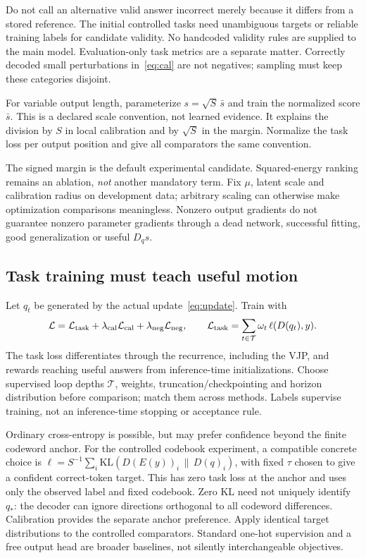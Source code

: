 \documentclass[11pt,a4paper]{article}
\begin{document}
Do not call an alternative valid answer incorrect merely because it differs from a stored reference. The initial controlled tasks need unambiguous targets or reliable training labels for candidate validity. No handcoded validity rules are supplied to the main model. Evaluation-only task metrics are a separate matter. Correctly decoded small perturbations in~\eqref{eq:cal} are not negatives; sampling must keep these categories disjoint.

For variable output length, parameterize $s=\sqrt S\,\bar s$ and train the normalized score $\bar s$. This is a declared scale convention, not learned evidence. It explains the division by $S$ in local calibration and by $\sqrt S$ in the margin. Normalize the task loss per output position and give all comparators the same convention.

The signed margin is the default experimental candidate. Squared-energy ranking remains an ablation, \emph{not} another mandatory term. Fix $\mu$, latent scale and calibration radius on development data; arbitrary scaling can otherwise make optimization comparisons meaningless. Nonzero output gradients do not guarantee nonzero parameter gradients through a dead network, successful fitting, good generalization or useful $D_qs$.

\subsection{Task training must teach useful motion}
Let $q_t$ be generated by the actual update~\eqref{eq:update}. Train with
\begin{equation}
\mathcal L=\mathcal L_{\rm task}
+\lambda_{\rm cal}\mathcal L_{\rm cal}
+\lambda_{\rm neg}\mathcal L_{\rm neg},\qquad
\mathcal L_{\rm task}=\sum_{t\in\mathcal T}\omega_t\,\ell(D(q_t),y).\label{eq:loss}
\end{equation}
The task loss differentiates through the recurrence, including the VJP, and rewards reaching useful answers from inference-time initializations. Choose supervised loop depths $\mathcal T$, weights, truncation/checkpointing and horizon distribution before comparison; match them across methods. Labels supervise training, not an inference-time stopping or acceptance rule.

Ordinary cross-entropy is possible, but may prefer confidence beyond the finite codeword anchor. For the controlled codebook experiment, a compatible concrete choice is $\ell=S^{-1}\sum_i\mathrm{KL}(D(E(y))_i\,\|\,D(q)_i)$, with fixed $\tau$ chosen to give a confident correct-token target. This has zero task loss at the anchor and uses only the observed label and fixed codebook. Zero KL need not uniquely identify $q_*$: the decoder can ignore directions orthogonal to all codeword differences. Calibration provides the separate anchor preference. Apply identical target distributions to the controlled comparators. Standard one-hot supervision and a free output head are broader baselines, not silently interchangeable objectives.
\end{document}
